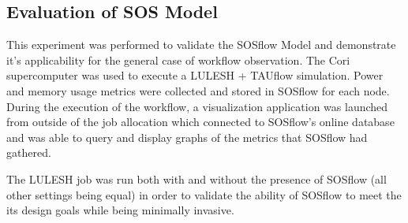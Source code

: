 \subsection{Evaluation of SOS Model} %
This experiment was performed to validate the SOSflow Model and
demonstrate it's applicability for the general case of workflow
observation.
%
The Cori supercomputer was used to execute a LULESH + TAUflow simulation. 
%
Power and memory usage metrics were collected and stored in SOSflow for
each node.
%
During the execution of the workflow, a visualization application was
launched from outside of the job allocation which connected to
SOSflow's online database and was able to query and display graphs of
the metrics that SOSflow had gathered.
%
\par
%
The LULESH job was run both with and without the presence of SOSflow
(all other settings being equal) in order to validate the ability of
SOSflow to meet the its design goals while being minimally invasive.
%
%


